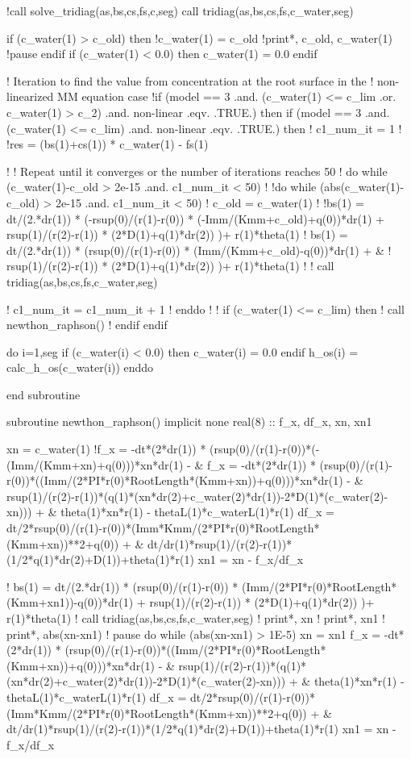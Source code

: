   !call solve_tridiag(as,bs,cs,fs,c,seg)
  call tridiag(as,bs,cs,fs,c_water,seg)
  
  if (c_water(1) > c_old) then
    !c_water(1) = c_old
    !print*, c_old, c_water(1)
    !pause
  endif
  if (c_water(1) < 0.0) then
    c_water(1) = 0.0
  endif

  ! Iteration to find the value from concentration at the root surface in the
  ! non-linearized MM equation case
  !if (model == 3 .and. (c_water(1) <= c_lim .or. c_water(1) > c_2) .and. non-linear .eqv. .TRUE.) then
  if (model == 3 .and. (c_water(1) <= c_lim) .and. non-linear .eqv. .TRUE.) then
  !  c1_num_it = 1
  !  !res = (bs(1)+cs(1)) * c_water(1) - fs(1)

  !  ! Repeat until it converges or the number of iterations reaches 50
  !  do while (c_water(1)-c_old > 2e-15 .and. c1_num_it < 50) 
  !  !do while (abs(c_water(1)-c_old) > 2e-15 .and. c1_num_it < 50) 
  !    c_old = c_water(1)
  !    !bs(1) = dt/(2.*dr(1)) * (-rsup(0)/(r(1)-r(0)) * (-Imm/(Kmm+c_old)+q(0))*dr(1) + rsup(1)/(r(2)-r(1)) * (2*D(1)+q(1)*dr(2)) )+ r(1)*theta(1)
  !    bs(1) = dt/(2.*dr(1)) * (rsup(0)/(r(1)-r(0)) * (Imm/(Kmm+c_old)-q(0))*dr(1) + &
  !            rsup(1)/(r(2)-r(1)) * (2*D(1)+q(1)*dr(2)) )+ r(1)*theta(1) 
  !    
  !    call tridiag(as,bs,cs,fs,c_water,seg)

  !    c1_num_it = c1_num_it + 1
  !  enddo
  ! 
  ! if (c_water(1) <= c_lim) then 
  !   call newthon_raphson()
  ! endif
  endif
  
  do i=1,seg
    if (c_water(i) < 0.0) then
      c_water(i) = 0.0
    endif
    h_os(i) = calc_h_os(c_water(i))
  enddo

end subroutine

subroutine newthon_raphson()
implicit none
  real(8) :: f_x, df_x, xn, xn1

  xn = c_water(1)
  !f_x = -dt*(2*dr(1)) * (rsup(0)/(r(1)-r(0))*(-(Imm/(Kmm+xn)+q(0)))*xn*dr(1) - &
  f_x = -dt*(2*dr(1)) * (rsup(0)/(r(1)-r(0))*((Imm/(2*PI*r(0)*RootLength*(Kmm+xn))+q(0)))*xn*dr(1) - &
    rsup(1)/(r(2)-r(1))*(q(1)*(xn*dr(2)+c_water(2)*dr(1))-2*D(1)*(c_water(2)-xn))) + &
    theta(1)*xn*r(1) - thetaL(1)*c_waterL(1)*r(1)
  df_x = dt/2*rsup(0)/(r(1)-r(0))*(Imm*Kmm/(2*PI*r(0)*RootLength*(Kmm+xn))**2+q(0)) + &
    dt/dr(1)*rsup(1)/(r(2)-r(1))*(1/2*q(1)*dr(2)+D(1))+theta(1)*r(1)
  xn1 = xn - f_x/df_x

!  bs(1) = dt/(2.*dr(1)) * (rsup(0)/(r(1)-r(0)) * (Imm/(2*PI*r(0)*RootLength*(Kmm+xn1))-q(0))*dr(1) + rsup(1)/(r(2)-r(1)) * (2*D(1)+q(1)*dr(2)) )+ r(1)*theta(1) 
!  call tridiag(as,bs,cs,fs,c_water,seg)
!  print*, xn
!  print*, xn1
!  print*, abs(xn-xn1)
!  pause
  do while (abs(xn-xn1) > 1E-5)
    xn = xn1
    f_x = -dt*(2*dr(1)) * (rsup(0)/(r(1)-r(0))*((Imm/(2*PI*r(0)*RootLength*(Kmm+xn))+q(0)))*xn*dr(1) - &
      rsup(1)/(r(2)-r(1))*(q(1)*(xn*dr(2)+c_water(2)*dr(1))-2*D(1)*(c_water(2)-xn))) + &
      theta(1)*xn*r(1) - thetaL(1)*c_waterL(1)*r(1)
    df_x = dt/2*rsup(0)/(r(1)-r(0))*(Imm*Kmm/(2*PI*r(0)*RootLength*(Kmm+xn))**2+q(0)) + &
      dt/dr(1)*rsup(1)/(r(2)-r(1))*(1/2*q(1)*dr(2)+D(1))+theta(1)*r(1)
    xn1 = xn - f_x/df_x
    
